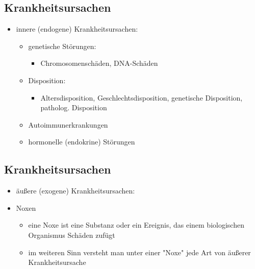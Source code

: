 \begin{it>emize}
\subsection{Krankheitsursachen}
	\begin{itemize}
		\item innere (endogene) Krankheitsursachen:
			\begin{itemize}
				\item genetische Störungen:
					\begin{itemize}
						\item Chromosomenschäden, DNA-Schäden
					\end{itemize}
				\item Disposition:
					\begin{itemize}
						\item Altersdisposition, Geschlechtsdisposition, genetische Disposition, patholog. Disposition
					\end{itemize}
				\item Autoimmunerkrankungen
				\item hormonelle (endokrine) Störungen
			\end{itemize}
	\end{itemize}

\subsection{Krankheitsursachen}
	\begin{itemize}
		\item äußere (exogene) Krankheitsursachen:
		\item Noxen
			\begin{itemize}
				\item eine Noxe ist eine Substanz oder ein Ereignis, das einem biologischen Organismus Schäden zufügt
				\item im weiteren Sinn versteht man unter einer "Noxe" jede Art von äußerer Krankheitsursache
			\end{itemize}
	\end{itemize}


\end{it>emize}
